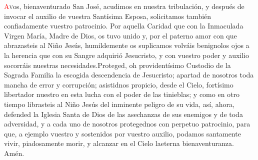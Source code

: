 \lettrine[lines=2]{\textcolor{red}{A}} vos, bienaventurado San José, acudimos en nuestra tribulación, y después de invocar el auxilio de vuestra Santísima Esposa, solicitamos
también confiadamente vuestro patrocinio. Por aquella Caridad que con la Inmaculada Virgen María, Madre de Dios, os tuvo unido y, por el paterno amor 
con que abrazasteis al Niño Jesús, humildemente os suplicamos volváis benignolos ojos a la herencia que con su Sangre adquirió Jesucristo, y con vuestro 
poder y auxilio socorráis nuestras necesidades.Proteged, oh providentísimo Custodio de la Sagrada Familia la escogida descendencia de Jesucristo; 
apartad de nosotros toda mancha de error y corrupción; asistidnos propicio, desde el Cielo, fortísimo libertador nuestro en esta lucha con el poder de
las tinieblas; y como en otro tiempo librasteis al Niño Jesús del inminente peligro de su vida, así, ahora, defended la Iglesia Santa de Dios de las 
asechanzas de sus enemigos y de toda adversidad, y a cada uno de nosotros protegednos con perpetuo patrocinio, para que, a ejemplo vuestro y sostenidos 
por vuestro auxilio, podamos santamente vivir, piadosamente morir, y alcanzar en el Cielo laeterna bienaventuranza. Amén.